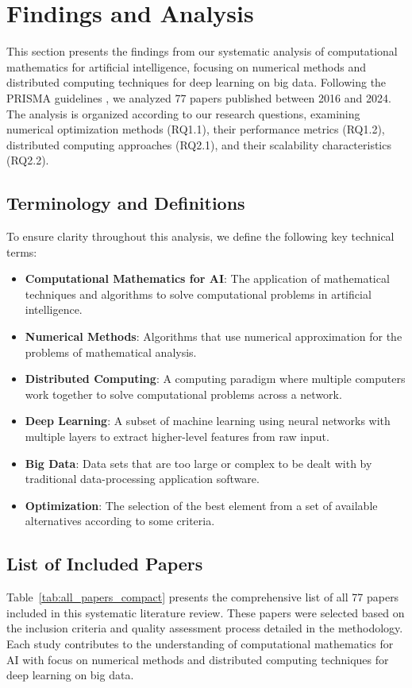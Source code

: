 \section{Findings and Analysis}

This section presents the findings from our systematic analysis of computational mathematics for artificial intelligence, focusing on numerical methods and distributed computing techniques for deep learning on big data. Following the PRISMA guidelines \citep{moher2009preferred}, we analyzed 77 papers published between 2016 and 2024. The analysis is organized according to our research questions, examining numerical optimization methods (RQ1.1), their performance metrics (RQ1.2), distributed computing approaches (RQ2.1), and their scalability characteristics (RQ2.2).

\subsection{Terminology and Definitions}
To ensure clarity throughout this analysis, we define the following key technical terms:
\begin{itemize}
    \item \textbf{Computational Mathematics for AI}: The application of mathematical techniques and algorithms to solve computational problems in artificial intelligence.
    \item \textbf{Numerical Methods}: Algorithms that use numerical approximation for the problems of mathematical analysis.
    \item \textbf{Distributed Computing}: A computing paradigm where multiple computers work together to solve computational problems across a network.
    \item \textbf{Deep Learning}: A subset of machine learning using neural networks with multiple layers to extract higher-level features from raw input.
    \item \textbf{Big Data}: Data sets that are too large or complex to be dealt with by traditional data-processing application software.
    \item \textbf{Optimization}: The selection of the best element from a set of available alternatives according to some criteria.
\end{itemize}

\subsection{List of Included Papers}
Table~\ref{tab:all_papers_compact} presents the comprehensive list of all 77 papers included in this systematic literature review. These papers were selected based on the inclusion criteria and quality assessment process detailed in the methodology. Each study contributes to the understanding of computational mathematics for AI with focus on numerical methods and distributed computing techniques for deep learning on big data.

